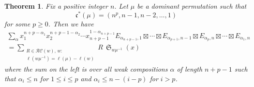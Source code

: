 \documentclass{amsart}
\newtheorem{proposition}[lemma]{Proposition}
\newtheorem{theorem}{Theorem}[section]
\theoremstyle{definition}
\theoremstyle{remark}
\numberwithin{equation}{section}
\DeclareMathOperator{\sch}{\mathfrak{S}}
\newcommand{\RC}{\mathcal{RC}}
\newcommand{\wof}[1]{w_{#1}}
\newcommand{\wtt}{\mathtt{wt}}
\newcommand{\code}{\mathfrak{c}}
\begin{document}

\begin{theorem}
Fix a positive integer $n$. Let $\mu$ be a dominant permutation such that 
$$\code^*(\mu)=(n^p, n-1, n-2, \ldots, 1)$$
for some $p\geq 0$. Then we have
\begin{multline*}
\sum_{\alpha}x_1^{n + p - \alpha_1}x_2^{n + p - 1 - \alpha_2}\cdots x_{n+p-1}^{1 - \alpha_{n+p-1}}
E_{\alpha_{n+p-1},1}\boxtimes  \cdots \boxtimes E_{\alpha_{p+1},n -1}\boxtimes E_{\alpha_p,n}\boxtimes \cdots \boxtimes E_{\alpha_1,n} \\
= \sum_{\substack{R\in\RC(w),\, w:\\[2pt] \ell(w\mu^{-1})=\ell(\mu)-\ell(w)}}R\,\sch_{w\mu^{-1}}(x)
\end{multline*}
where the sum on the left is over all weak compositions $\alpha$ of length $n+p-1$ such that $\alpha_i\leq n$ for $1\leq i\leq p$ and $\alpha_i\leq n - (i-p)$ for $i>p$. 
\end{theorem}
\end{document}
